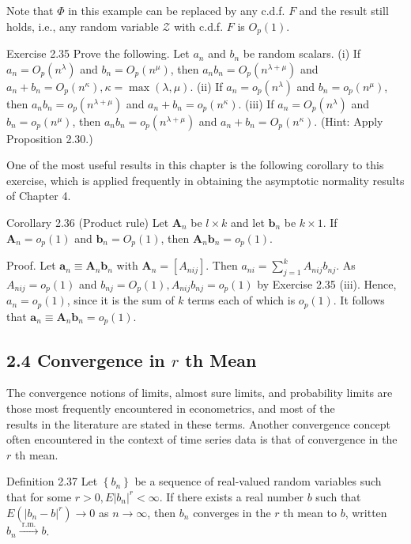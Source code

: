 \documentclass[10pt]{article}
\begin{document}
Note that $\Phi$ in this example can be replaced by any c.d.f. $F$ and the result still holds, i.e., any random variable $\mathcal{Z}$ with c.d.f. $F$ is $O_{p}(1)$.

Exercise 2.35 Prove the following. Let $a_{n}$ and $b_{n}$ be random scalars. (i) If $a_{n}=O_{p}\left(n^{\lambda}\right)$ and $b_{n}=O_{p}\left(n^{\mu}\right)$, then $a_{n} b_{n}=O_{p}\left(n^{\lambda+\mu}\right)$ and $a_{n}+b_{n}= O_{p}\left(n^{\kappa}\right), \kappa=\max (\lambda, \mu)$. (ii) If $a_{n}=o_{p}\left(n^{\lambda}\right)$ and $b_{n}=o_{p}\left(n^{\mu}\right)$, then $a_{n} b_{n}= o_{p}\left(n^{\lambda+\mu}\right)$ and $a_{n}+b_{n}=o_{p}\left(n^{\kappa}\right)$. (iii) If $a_{n}=O_{p}\left(n^{\lambda}\right)$ and $b_{n}=o_{p}\left(n^{\mu}\right)$, then $a_{n} b_{n}=o_{p}\left(n^{\lambda+\mu}\right)$ and $a_{n}+b_{n}=O_{p}\left(n^{\kappa}\right)$. (Hint: Apply Proposition 2.30.)

One of the most useful results in this chapter is the following corollary to this exercise, which is applied frequently in obtaining the asymptotic normality results of Chapter 4.

Corollary 2.36 (Product rule) Let $\mathbf{A}_{n}$ be $l \times k$ and let $\mathbf{b}_{n}$ be $k \times 1$. If $\mathbf{A}_{n}=o_{p}(1)$ and $\mathbf{b}_{n}=O_{p}(1)$, then $\mathbf{A}_{n} \mathbf{b}_{n}=o_{p}(1)$.

Proof. Let $\mathbf{a}_{n} \equiv \mathbf{A}_{n} \mathbf{b}_{n}$ with $\mathbf{A}_{n}=\left[A_{n i j}\right]$. Then $a_{n i}=\sum_{j=1}^{k} A_{n i j} b_{n j}$. As $A_{n i j}=o_{p}(1)$ and $b_{n j}=O_{p}(1), A_{n i j} b_{n j}=o_{p}(1)$ by Exercise 2.35 (iii). Hence, $a_{n}=o_{p}(1)$, since it is the sum of $k$ terms each of which is $o_{p}(1)$. It follows that $\mathbf{a}_{n} \equiv \mathbf{A}_{n} \mathbf{b}_{n}=o_{p}(1)$.

\subsection*{2.4 Convergence in $r$ th Mean}
The convergence notions of limits, almost sure limits, and probability limits are those most frequently encountered in econometrics, and most of the\\
results in the literature are stated in these terms. Another convergence concept often encountered in the context of time series data is that of convergence in the $r$ th mean.

Definition 2.37 Let $\left\{b_{n}\right\}$ be a sequence of real-valued random variables such that for some $r>0, E\left|b_{n}\right|^{r}<\infty$. If there exists a real number $b$ such that $E\left(\left|b_{n}-b\right|^{r}\right) \rightarrow 0$ as $n \rightarrow \infty$, then $b_{n}$ converges in the $r$ th mean to $b$, written $b_{n} \xrightarrow{\text { r.m. }} b$.
\end{document}
